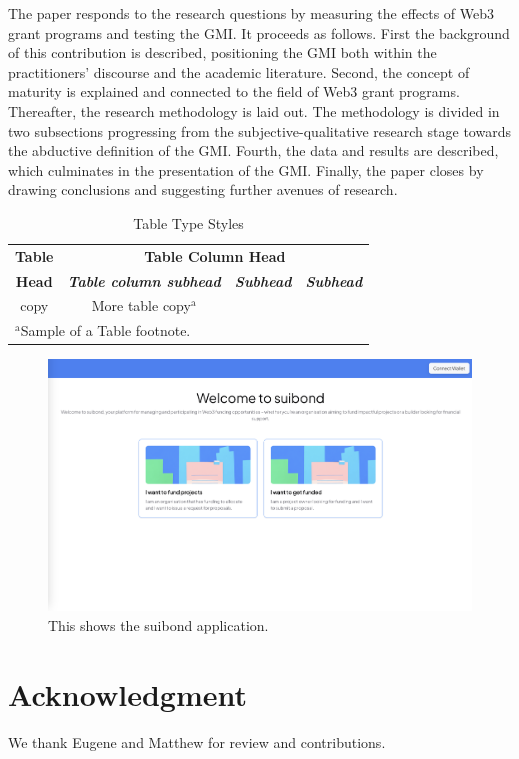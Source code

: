 \documentclass[conference]{IEEEtran}
\begin{document}
The paper responds to the research questions by measuring the effects of Web3 grant programs and testing the GMI. It proceeds as follows. First the background of this contribution is described, positioning the GMI both within the practitioners’ discourse and the academic literature. Second, the concept of maturity is explained and connected to the field of Web3 grant programs. Thereafter, the research methodology is laid out. The methodology is divided in two subsections progressing from the subjective-qualitative research stage towards the abductive definition of the GMI. Fourth, the data and results are described, which culminates in the presentation of the GMI. Finally, the paper closes by drawing conclusions and suggesting further avenues of research.


\begin{table}[htbp]
\caption{Table Type Styles}
\begin{center}
\begin{tabular}{|c|c|c|c|}
\hline
\textbf{Table}&\multicolumn{3}{|c|}{\textbf{Table Column Head}} \\
\cline{2-4} 
\textbf{Head} & \textbf{\textit{Table column subhead}}& \textbf{\textit{Subhead}}& \textbf{\textit{Subhead}} \\
\hline
copy& More table copy$^{\mathrm{a}}$& &  \\
\hline
\multicolumn{4}{l}{$^{\mathrm{a}}$Sample of a Table footnote.}
\end{tabular}
\label{tab1}
\end{center}
\end{table}

\begin{figure}[htbp]
\centerline{\includegraphics[scale=0.1]{suibond.png}}
\caption{This shows the suibond application.}
\label{fig}
\end{figure}


\section*{Acknowledgment}

We thank Eugene and Matthew for review and contributions.



\end{document}
